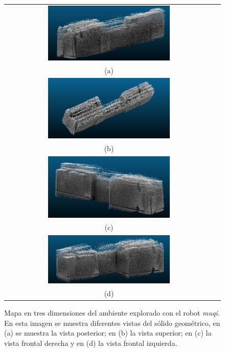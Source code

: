 \begin{figure}%
    \centering
    \begin{tabular}{cc}
      \includegraphics[width=0.60\textwidth]{images/3DSotano1.png}\\
      (a)\\
      \includegraphics[width=0.60\textwidth]{images/3DSotano2.png}\\
      (b)\\
      \includegraphics[width=0.60\textwidth]{images/3DSotano3.png}\\
      (c)\\
      \includegraphics[width=0.60\textwidth]{images/3DSotano4.png}\\
      (d)
    \end{tabular}
  \captionsetup{font=footnotesize}
    \caption{\label{fig:Sotano3D}Mapa en tres dimensiones del ambiente
    explorado con el robot \textit{muqi}. En esta imagen se muestra 
    diferentes vistas del sólido geométrico, en (a) se muestra la vista 
    posterior; en (b) la vista superior; en (c) la vista frontal derecha y 
    en (d) la vista frontal izquierda.}
\end{figure} 


